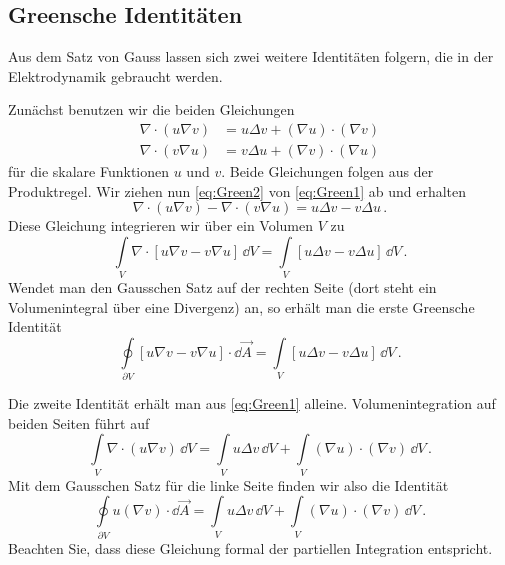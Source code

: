 \documentclass[paper=a4, fontsize=11.0pt, abstractoff, DIV12]{scrartcl}
\begin{document}
\subsection{Greensche Identitäten}

Aus dem Satz von Gauss lassen sich zwei weitere Identitäten folgern, die in der
Elektrodynamik gebraucht werden.

Zunächst benutzen wir die beiden Gleichungen
\begin{align}
\nabla\cdot\left(u\nabla v\right) &= u\Delta v + (\nabla u)\cdot(\nabla v)\label{eq:Green1}\\
\nabla\cdot\left(v\nabla u\right) &= v\Delta u + (\nabla v)\cdot(\nabla u)\label{eq:Green2}
\end{align}
für die skalare Funktionen $u$ und $v$. Beide Gleichungen folgen aus der
Produktregel. Wir ziehen nun \eqref{eq:Green2} von \eqref{eq:Green1} ab und
erhalten
\begin{equation*}
\nabla \cdot(u\nabla v) - \nabla\cdot(v\nabla u) = u\Delta v - v\Delta u\, .
\end{equation*}
Diese Gleichung integrieren wir über ein Volumen $V$ zu
\begin{equation*}
\int\limits_{V} \nabla\cdot \left[u\nabla v - v\nabla u\right]\,\dd V =\int\limits_{V} \left[ u\Delta v - v\Delta u\right]\,\dd V\, .
\end{equation*}
Wendet man den Gausschen Satz auf der rechten Seite (dort steht ein
Volumenintegral über eine Divergenz) an, so erhält man die erste Greensche
Identität
\begin{equation}
\oint\limits_{\partial V} \left[u\nabla v - v\nabla u\right]\cdot\dd \vec A = \int\limits_{V} \left[ u\Delta v - v\Delta u\right]\,\dd V\, .
\end{equation}

Die zweite Identität erhält man aus \eqref{eq:Green1} alleine.
Volumenintegration auf beiden Seiten führt auf
\begin{equation*}
\int\limits_{V}\nabla\cdot(u\nabla v) \, \dd V = \int\limits_{V} u \Delta v\, \dd V + \int\limits_{V} (\nabla u) \cdot (\nabla v)\,\dd V\,.
\end{equation*}
Mit dem Gausschen Satz für die linke Seite finden wir also die Identität
\begin{equation}
\oint\limits_{\partial V} u \left(\nabla v\right)\cdot\dd \vec A = \int\limits_{V} u \Delta v\, \dd V + \int\limits_{V} (\nabla u) \cdot (\nabla v)\,\dd V\,.
\end{equation}
Beachten Sie, dass diese Gleichung formal der partiellen Integration entspricht.
\end{document}
